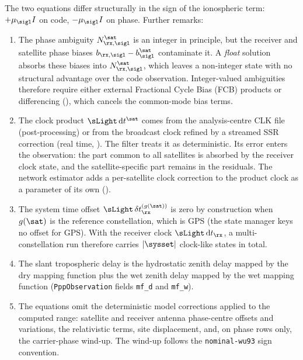 The two equations differ structurally in the sign of the ionospheric
term: $+\mu_\sigl I$ on code, $-\mu_\sigl I$ on phase.  Further
remarks:

\begin{enumerate}[leftmargin=*, itemsep=0pt]
\item The phase ambiguity $N^\sat_{\rx,\sigl}$ is an integer in
      principle, but the receiver and satellite phase biases
      $b_{\rx,\sigl} - b^\sat_\sigl$ contaminate it.  A \emph{float}
      solution absorbs these biases into $N^\sat_{\rx,\sigl}$, which
      leaves a non-integer state with no structural advantage over the
      code observation.  Integer-valued ambiguities therefore require
      either external Fractional Cycle Bias (FCB) products or
      differencing (), which cancels the common-mode
      bias terms.
\item The clock product $\sLight\,\mathrm{d}t^\sat$ comes from the
      analysis-centre CLK file (post-processing) or from the broadcast
      clock refined by a streamed SSR correction (real time,
      ).  The filter treats
      it as deterministic.  Its error enters the observation: the part
      common to all satellites is absorbed by the receiver clock state,
      and the satellite-specific part remains in the residuals.  The
      network estimator adds a per-satellite clock correction to the
      product clock as a parameter of its own ().
\item The system time offset $\sLight\,\delta t^{(g(\sat))}_\rx$ is
      zero by construction when $g(\sat)$ is the reference
      constellation, which is GPS (the state manager keys no offset for
      GPS).  With the receiver clock $\sLight\,\mathrm{d}t_\rx$, a
      multi-constellation run therefore carries $|\sysset|$ clock-like
      states in total.
\item The slant tropospheric delay is the hydrostatic
      zenith delay mapped by the dry mapping function plus the wet
      zenith delay mapped by the wet mapping function
      (\texttt{PppObservation} fields \texttt{mf\_d} and \texttt{mf\_w}).
\item The equations omit the deterministic model corrections applied to
      the computed range: satellite and receiver antenna phase-centre
      offsets and variations, the relativistic terms, site displacement,
      and, on phase rows only, the carrier-phase wind-up.  The wind-up
      follows the \texttt{nominal-wu93} sign convention.
\end{enumerate}

